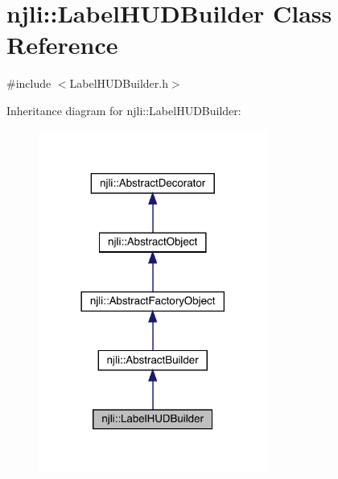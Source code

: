 \hypertarget{classnjli_1_1_label_h_u_d_builder}{}\section{njli\+:\+:Label\+H\+U\+D\+Builder Class Reference}
\label{classnjli_1_1_label_h_u_d_builder}


{\ttfamily \#include $<$Label\+H\+U\+D\+Builder.\+h$>$}



Inheritance diagram for njli\+:\+:Label\+H\+U\+D\+Builder\+:\nopagebreak
\begin{figure}[H]
\begin{center}
\leavevmode
\includegraphics[width=213pt]{classnjli_1_1_label_h_u_d_builder__inherit__graph}
\end{center}
\end{figure}


